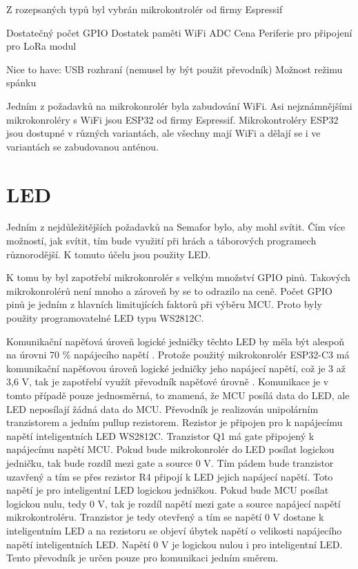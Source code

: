 
Z rozepsaných typů byl vybrán mikrokontrolér od firmy Espressif 


Dostatečný počet GPIO %
Dostatek paměti %
WiFi
ADC %
Cena %
Periferie pro připojení pro LoRa modul

Nice to have:
USB rozhraní (nemusel by být použit převodník)
Možnost režimu spánku %


Jedním z požadavků na mikrokonrolér byla zabudování WiFi. Asi nejznámnějšími mikrokonroléry s WiFi jsou ESP32 od firmy 
Espressif. Mikrokontroléry ESP32 jsou dostupné v různých variantách, ale všechny mají WiFi a dělají se i ve variantách 
se zabudovanou anténou. 

\section{LED}
Jedním z nejdůležitějších požadavků na Semafor bylo, aby mohl svítit. Čím více možností, jak svítit, tím bude využití 
při hrách a táborových programech různorodější. K tomuto účelu jsou použity LED. 

K tomu by byl zapotřebí mikrokonrolér s velkým množství GPIO pinů. Takových mikrokonrolérů není mnoho a zároveň 
by se to odrazilo na ceně. Počet GPIO pinů je jedním z hlavních limitujících faktorů při výběru MCU. Proto byly použity programovatelné 
LED typu WS2812C.



Komunikační napěťová úroveň logické jedničky těchto LED by měla být alespoň na úrovni 70 \% napájecího napětí \cite{WS2812C_dtsh}. 
Protože použitý mikrokonrolér ESP32-C3 má komunikační napěťovou úroveň logické jedničky jeho napájecí napětí, což je 3 až 3,6 V, 
tak je zapotřebí využít převodník napěťové úrovně \cite{ESP_C3_dtsh}. Komunikace je v tomto případě pouze jednosměrná, 
to znamená, že MCU posílá data do LED, ale LED neposílají žádná data do MCU. Převodník je realizován unipolárním tranzistorem 
a jedním pullup rezistorem. Rezistor je připojen pro k napájecímu napětí inteligentních LED WS2812C. 
Tranzistor Q1 má gate připojený k napájecímu napětí MCU. Pokud bude mikrokonrolér do LED posílat logickou jedničku, tak bude rozdíl
mezi gate a source 0 V. Tím pádem bude tranzistor uzavřený a tím se přes rezistor R4 připojí k LED jejich napájecí napětí. Toto napětí 
je pro inteligentní LED logickou jedničkou. Pokud bude MCU posílat logickou nulu, tedy 0 V, tak je rozdíl napětí mezi gate a source 
napájecí napětí mikrokontroléru. Tranzistor je tedy otevřený a tím se napětí 0 V dostane k inteligentním LED a na rezistoru se objeví
úbytek napětí o velikosti napájecího napětí inteligentních LED. Napětí 0 V je logickou nulou i pro inteligentní LED. Tento převodník
je určen pouze pro komunikaci jedním směrem. 

